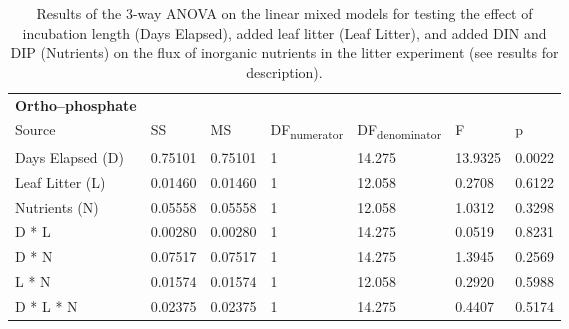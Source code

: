 \begin{table}
\begin{tabular}{ l l l l l l l }
\textbf{Ortho--phosphate} & & & & & &\\
Source           & SS      & MS      & DF\textsubscript{numerator} & DF\textsubscript{denominator} & F       & p  \\
Days Elapsed (D) & 0.75101 & 0.75101 & 1                           & 14.275                        & 13.9325 & 0.0022 \\
Leaf Litter (L)  & 0.01460 & 0.01460 & 1                           & 12.058                        & 0.2708  & 0.6122 \\
Nutrients (N)    & 0.05558 & 0.05558 & 1                           & 12.058                        & 1.0312  & 0.3298 \\
D * L            & 0.00280 & 0.00280 & 1                           & 14.275                        & 0.0519  & 0.8231 \\
D * N            & 0.07517 & 0.07517 & 1                           & 14.275                        & 1.3945  & 0.2569 \\
L * N            & 0.01574 & 0.01574 & 1                           & 12.058                        & 0.2920  & 0.5988 \\
D * L * N        & 0.02375 & 0.02375 & 1                           & 14.275                        & 0.4407  & 0.5174 \\

\end{tabular}
\caption{Results of the 3-way ANOVA on the linear mixed models for testing the effect of incubation length (Days Elapsed), added leaf litter (Leaf Litter), and added DIN and DIP (Nutrients) on the flux of inorganic nutrients in the litter experiment (see results for description).}
\end{table}